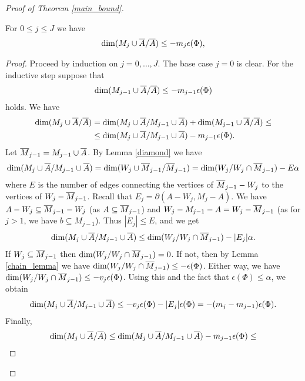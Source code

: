 \begin{proof} [Proof of Theorem \ref{main_bound}]
  \begin{Lemma} \label{ubdim_lemma}
    For $0 \leq j \leq J$ we have
    \begin{align*}
      \dim(M_j \cup \overline{A} / \overline{A}) \leq -m_j  \epsilon(\Phi),
    \end{align*}
  \end{Lemma}
  \begin{proof}
    Proceed by induction on $j = 0, \ldots, J$. The base case $j = 0$ is clear.
    For the inductive step suppose that
    \begin{align*}
      \dim(M_{j-1} \cup \overline{A} / \overline{A}) \leq  - m_{j-1}  \epsilon(\Phi)
    \end{align*}
    holds.
    We have
    \begin{align*}
      \dim(M_j \cup \overline{A} / \overline{A}) &= \dim(M_j \cup \overline{A} / M_{j-1} \cup \overline{A}) + \dim(M_{j-1} \cup \overline{A} / \overline{A}) \leq \\
      &\leq \dim(M_j \cup \overline{A} / M_{j-1} \cup \overline{A}) - m_{j-1}  \epsilon(\Phi).
    \end{align*}
    Let ${\overline{M}}_{j-1} = M_{j-1} \cup \overline{A}$.
    By Lemma \ref{diamond} we have
    \begin{align*}
      \dim(M_j \cup \overline{A} / M_{j-1} \cup \overline{A}) = \dim(W_j \cup {\overline{M}}_{j-1} / {\overline{M}}_{j-1}) = \dim(W_j / W_j \cap {\overline{M}}_{j-1}) - E \alpha
    \end{align*}
    where $E$ is the number of edges connecting the vertices of ${\overline{M}}_{j-1} - W_j$ to the vertices of $W_j - {\overline{M}}_{j-1}$.
    Recall that       $E_j = \partial(A - W_j, M_j - A)$.
    We have $A - W_j \subseteq {\overline{M}}_{j-1} - W_j$ (as $A \subseteq {\overline{M}}_{j-1}$) and $W_j - M_{j-1} - A = W_j - {\overline{M}}_{j-1}$ (as for $j > 1$, we have $b \subseteq M_{j-1}$).
    Thus $|E_j| \leq E$, and we get 
    \begin{align*}
      \dim(M_j \cup \overline{A} / M_{j-1} \cup \overline{A}) \leq \dim(W_j / W_j \cap {\overline{M}}_{j-1}) - |E_j| \alpha.
    \end{align*}
    If $W_j \subseteq {\overline{M}}_{j-1}$ then $\dim(W_j / W_j \cap {\overline{M}}_{j-1}) = 0$.
    If not, then by Lemma \ref{chain_lemma} we have $\dim(W_j / W_j \cap {\overline{M}}_{j-1}) \leq - \epsilon(\Phi)$.
    Either way, we have $\dim(W_j / W_j \cap {\overline{M}}_{j-1}) \leq - v_j \epsilon(\Phi)$.
    Using this and the fact that $\epsilon(\Phi) \leq \alpha$, we obtain
    \begin{align*}
      \dim(M_j \cup \overline{A} / M_{j-1} \cup \overline{A}) \leq - v_j \epsilon(\Phi) - |E_j| \epsilon(\Phi) = -(m_j - m_{j-1})\epsilon(\Phi).
    \end{align*}
    Finally,
    \begin{align*}
      \dim(M_j \cup \BA / \BA) &\leq \dim(M_j \cup \BA / M_{j-1} \cup \BA) - m_{j-1}  \epsilon(\Phi) \leq \\

\end{align*}
\end{proof}
\end{proof}
